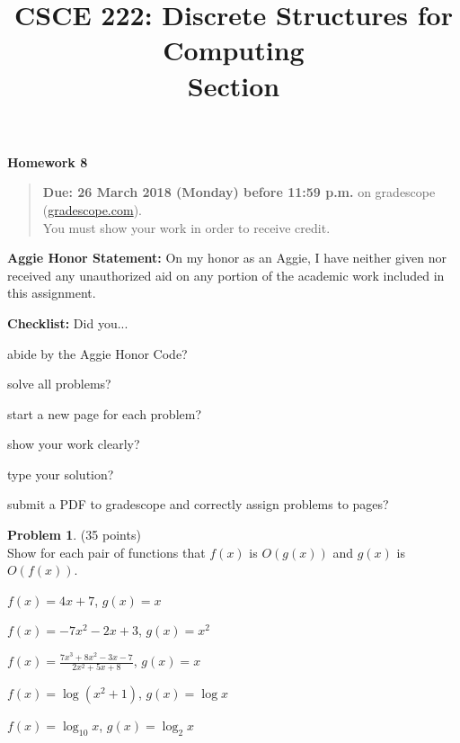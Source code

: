 \documentclass{article}
\title{CSCE 222: Discrete Structures for Computing\\Section \mysectionnumber\\\mysemester}
\author{\myname}
\date{}
\theoremstyle{definition}
\newtheorem{problem}{Problem}
\newcommand{\honor}{\noindent \textbf{Aggie Honor Statement: }On my honor as an Aggie, I have neither
  given nor received any unauthorized aid on any portion of the academic work included in this assignment.
}
\newcommand{\checklist}{\noindent\textbf{Checklist:}
Did you...
\begin{compactenum}
\item abide by the Aggie Honor Code?
\item solve all problems?
\item start a new page for each problem?
\item show your work clearly?
\item type your solution?
\item submit a PDF to gradescope and correctly assign problems to pages?
\end{compactenum}
}
\newcommand{\problemset}[1]{\begin{center}\textbf{Homework #1}\end{center}}
\newcommand{\duedate}[1]{\begin{quote}\textbf{Due: #1} on gradescope (\url{gradescope.com}). \\You must show your work in order to receive credit.\end{quote}}
\newcommand{\homeworknumber}[0]{8}
\begin{document}
\maketitle
\problemset{\homeworknumber}
\duedate{26 March 2018 (Monday) before 11:59 p.m.}
\bigskip

\honor
\bigskip

\checklist

\begin{problem} (35 points)\\
Show for each pair of functions that $f(x)$ is $O(g(x))$ and $g(x)$ is $O(f(x))$.
\begin{compactenum}
\item $f(x) = 4x+7$, $g(x) = x$
\item $f(x) = -7x^2 - 2x + 3$, $g(x) = x^2$
\item $\displaystyle f(x) = \frac{7x^3 + 8x^2 - 3x - 7}{2x^2 + 5x + 8}$, $g(x) = x$
\item $f(x) = \log (x^2+1)$, $g(x) = \log x$
\item $f(x) = \log_{10} x$, $g(x) = \log_2 x$
\end{compactenum}
\end{problem}
\end{document}
